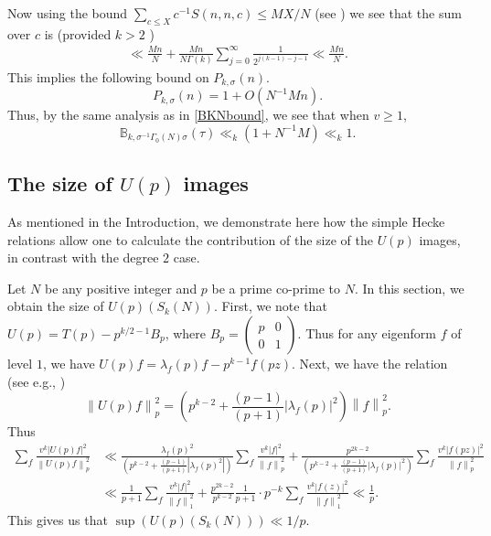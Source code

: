 \documentclass[11pt]{amsart}
\numberwithin{equation}{section}
\theoremstyle{plain}
\theoremstyle{definition}
\newcommand{\mbb}{\mathbb}
\newcommand*{\norm}[1]{\left\lVert#1\right\rVert}
\newcommand{\smat}[4]{\left( \begin{smallmatrix}#1&#2\\#3&#4\end{smallmatrix}\right)}
\begin{document}
Now using the bound $\sum_{c\le X}c^{-1} { S(n,n,c)}\le MX/N$ (see \cite[(4.2)]{iwaniecaut}) we see that the sum over $c$ is (provided $k>2$ )
\begin{align}
    \ll \frac{Mn}{N}+\frac{Mn}{N\Gamma(k)}\sum_{j=0}^{\infty}\frac{1}{2^{j(k-1)-j-1}}\ll \frac{Mn}{N}.
\end{align}
This implies the following bound on $P_{k,\sigma}(n)$.
\begin{equation}
    P_{k,\sigma}(n)= 1+O(N^{-1}Mn).
\end{equation}
Thus, by the same analysis as in \eqref{BKNbound}, we see that when $v\ge 1$,
\begin{equation}\label{BKsigma}
    \mbb B_{k,\sigma^{-1} \Gamma_0(N) \sigma}(\tau)\ll_k \left(1+N^{-1}M\right)\ll _k 1.
\end{equation}
\subsection{The size of \texorpdfstring{$U(p)$}{U(p)} images}\label{Upcontn=1} 
As mentioned in the Introduction, we demonstrate here how the simple Hecke relations allow one to calculate the contribution of the size of the $U(p)$ images, in contrast with the degree $2$ case.

Let $N$ be any positive integer and $p$ be a prime co-prime to $N$. In this section, we obtain the size of $U(p)\left(S_k(N)\right)$. First, we note that $U(p)=T(p)-p^{k/2-1}B_p$, where $B_p=\smat{p}{0}{0}{1}$. Thus for any eigenform $f$ of level $1$, we have $U(p)f= \lambda_f(p) f- p^{k-1} f(pz)$. Next, we have the relation (see e.g., \cite{anamby2019distinguishing})
\begin{equation}
    \norm {U(p)f}_p^2 = \left(p^{k-2}+ \frac{(p-1)}{(p+1)}|\lambda_f(p)|^2 \right) \norm{f}_p^2.
\end{equation} Thus
\begin{align}
    \sum_{f} \frac{v^k|U(p)f|^2}{\norm {U(p)f}_p^2} &\ll \frac{\lambda_f(p)^2}{\left(p^{k-2}+ \frac{(p-1)}{(p+1)}|\lambda_f(p)^2 |\right)} \sum_f \frac{v^k |f|^2}{\norm{f}_p^2} + \frac{p^{2k-2}}{\left(p^{k-2}+ \frac{(p-1)}{(p+1)}|\lambda_f(p)|^2 \right)} \sum_f \frac{v^k |f(pz)|^2}{\norm{f}_p^2}\\
    &\ll \frac{1}{p+1} \sum_f \frac{v^k |f|^2}{\norm{f}_1^2} + \frac{p^{2k-2}}{p^{k-2}} \frac{1}{p+1} \cdot p^{-k} \sum_f \frac{v^k |f(z)|^2}{\norm{f}_1^2}
    \ll \frac{1}{p}.
\end{align}
This gives us that $\sup(U(p)\left(S_k(N)\right))\ll 1/p$.
\end{document}
